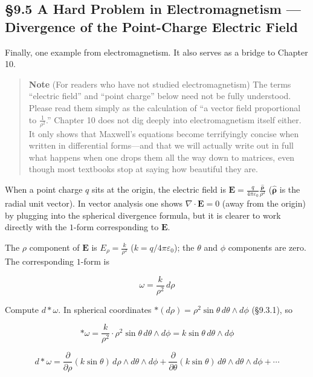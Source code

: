\documentclass[a4paper,12pt,openany]{book}
\begin{document}
\hypertarget{a-hard-problem-in-electromagnetism-divergence-of-the-point-charge-electric-field}{%
\subsection{§9.5 A Hard Problem in Electromagnetism — Divergence of
the Point-Charge Electric
Field}\label{a-hard-problem-in-electromagnetism-divergence-of-the-point-charge-electric-field}}

Finally, one example from electromagnetism. It also serves as a bridge
to Chapter 10.

\begin{quote}
\textbf{Note} (For readers who have not studied electromagnetism) The
terms ``electric field'' and ``point charge'' below need not be fully
understood. Please read them simply as the calculation of ``a vector
field proportional to \(\frac{1}{\rho^2}\).'' Chapter 10 does not dig
deeply into electromagnetism itself either. It only shows that Maxwell's
equations become terrifyingly concise when written in differential
forms—and that we will actually write out in full what happens when
one drops them all the way down to matrices, even though most textbooks
stop at saying how beautiful they are.
\end{quote}

When a point charge \(q\) sits at the origin, the electric field is
\(\mathbf{E} = \frac{q}{4\pi\varepsilon_0}\frac{\hat{\boldsymbol{\rho}}}{\rho^2}\)
(\(\hat{\boldsymbol{\rho}}\) is the radial unit vector). In vector
analysis one shows \(\nabla\cdot\mathbf{E} = 0\) (away from the origin)
by plugging into the spherical divergence formula, but it is clearer to
work directly with the \(1\)-form corresponding to \(\mathbf{E}\).

The \(\rho\) component of \(\mathbf{E}\) is
\(E_\rho = \frac{k}{\rho^2}\) (\(k = q/4\pi\varepsilon_0\)); the
\(\theta\) and \(\phi\) components are zero. The corresponding
\(1\)-form is

\[\omega = \frac{k}{\rho^2}\,d\rho\]

Compute \(d\ast\omega\). In spherical coordinates
\(\ast(d\rho) = \rho^2\sin\theta\,d\theta\wedge d\phi\) (§9.3.1), so

\[\ast\omega = \frac{k}{\rho^2} \cdot \rho^2\sin\theta\,d\theta\wedge d\phi = k\sin\theta\,d\theta\wedge d\phi\]

\[d\ast\omega = \frac{\partial}{\partial\rho}(k\sin\theta)\,d\rho\wedge d\theta\wedge d\phi + \frac{\partial}{\partial\theta}(k\sin\theta)\,d\theta\wedge d\theta\wedge d\phi + \cdots\]
\end{document}

